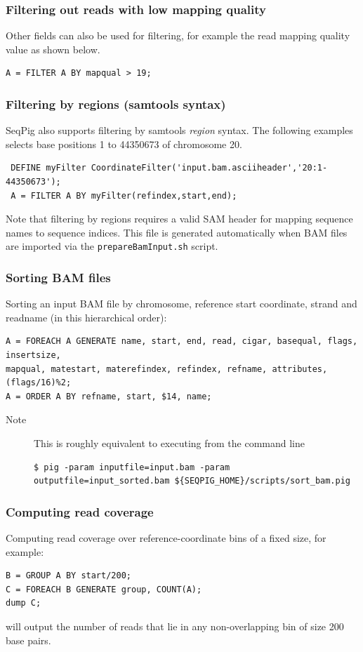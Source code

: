 \subsubsection{Filtering out reads with low mapping quality}

Other fields can also be used for filtering, for example the read
mapping quality value as shown below.
\begin{lstlisting}
A = FILTER A BY mapqual > 19;
\end{lstlisting}

\subsubsection{Filtering by regions (samtools syntax)}

SeqPig also supports filtering by samtools \emph{region} syntax.
The following examples selects base positions 1 to 44350673
of chromosome 20.
\begin{lstlisting}
 DEFINE myFilter CoordinateFilter('input.bam.asciiheader','20:1-44350673');
 A = FILTER A BY myFilter(refindex,start,end);
\end{lstlisting}
Note that filtering by regions requires a valid SAM header for mapping
sequence names to sequence indices. This file is generated automatically
when BAM files are imported via the {\tt prepareBamInput.sh} script.

\subsubsection{Sorting BAM files}
Sorting an input BAM file by chromosome, reference start coordinate, strand
and readname (in this hierarchical order):
\begin{lstlisting}
A = FOREACH A GENERATE name, start, end, read, cigar, basequal, flags, insertsize,
mapqual, matestart, materefindex, refindex, refname, attributes, (flags/16)%2;
A = ORDER A BY refname, start, $14, name;
\end{lstlisting}
\begin{description}
	\item[Note] This is roughly equivalent to executing from the command line
\begin{lstlisting}
$ pig -param inputfile=input.bam -param outputfile=input_sorted.bam ${SEQPIG_HOME}/scripts/sort_bam.pig
\end{lstlisting}
\end{description}

 \subsubsection{Computing read coverage}
Computing read coverage over reference-coordinate bins of a fixed size,
for example:
\begin{lstlisting}
B = GROUP A BY start/200;
C = FOREACH B GENERATE group, COUNT(A);
dump C; 
\end{lstlisting}
will output the number of reads that lie in any non-overlapping bin of size 200 base pairs.

